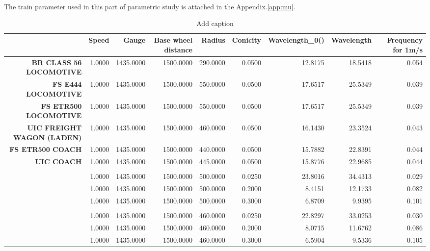 The train parameter used in this part of parametric study is attached in the Appendix.\ref{app:mu}. 

\begin{table}[htbp]
  \centering
  \caption{Add caption}
    \begin{tabular}{rrrrrrrrr}
    \toprule
    \textbf{} & \textbf{Speed} & \textbf{Gauge} & \textbf{Base wheel distance} & \textbf{Radius} & \textbf{Conicity} & \textbf{Wavelength\_0()} & \textbf{Wavelength} & \textbf{Frequency for 1m/s} \\
    \midrule
    \textbf{BR CLASS 56 LOCOMOTIVE} & 1.0000 & 1435.0000 & 1500.0000 & 290.0000 & 0.0500 & 12.8175 & 18.5418 & 0.054 \\
    \textbf{FS E444 LOCOMOTIVE} & 1.0000 & 1435.0000 & 1500.0000 & 550.0000 & 0.0500 & 17.6517 & 25.5349 & 0.039 \\
    \textbf{FS ETR500 LOCOMOTIVE} & 1.0000 & 1435.0000 & 1500.0000 & 550.0000 & 0.0500 & 17.6517 & 25.5349 & 0.039 \\
    \textbf{UIC FREIGHT WAGON (LADEN)} & 1.0000 & 1435.0000 & 1500.0000 & 460.0000 & 0.0500 & 16.1430 & 23.3524 & 0.043 \\
    \textbf{FS ETR500 COACH} & 1.0000 & 1435.0000 & 1500.0000 & 440.0000 & 0.0500 & 15.7882 & 22.8391 & 0.044 \\
    \textbf{UIC COACH} & 1.0000 & 1435.0000 & 1500.0000 & 445.0000 & 0.0500 & 15.8776 & 22.9685 & 0.044 \\
    \textbf{} &       &       &       &       &       &       &       &  \\
    \textbf{} & 1.0000 & 1435.0000 & 1500.0000 & 500.0000 & 0.0250 & 23.8016 & 34.4313 & 0.029 \\
    \textbf{} & 1.0000 & 1435.0000 & 1500.0000 & 500.0000 & 0.2000 & 8.4151 & 12.1733 & 0.082 \\
    \textbf{} & 1.0000 & 1435.0000 & 1500.0000 & 500.0000 & 0.3000 & 6.8709 & 9.9395 & 0.101 \\
    \textbf{} &       &       &       &       &       &       &       &  \\
    \textbf{} & 1.0000 & 1435.0000 & 1500.0000 & 460.0000 & 0.0250 & 22.8297 & 33.0253 & 0.030 \\
    \textbf{} & 1.0000 & 1435.0000 & 1500.0000 & 460.0000 & 0.2000 & 8.0715 & 11.6762 & 0.086 \\
    \textbf{} & 1.0000 & 1435.0000 & 1500.0000 & 460.0000 & 0.3000 & 6.5904 & 9.5336 & 0.105 \\
    \bottomrule
    \end{tabular}%
  \label{tab:addlabel}%
\end{table}%




